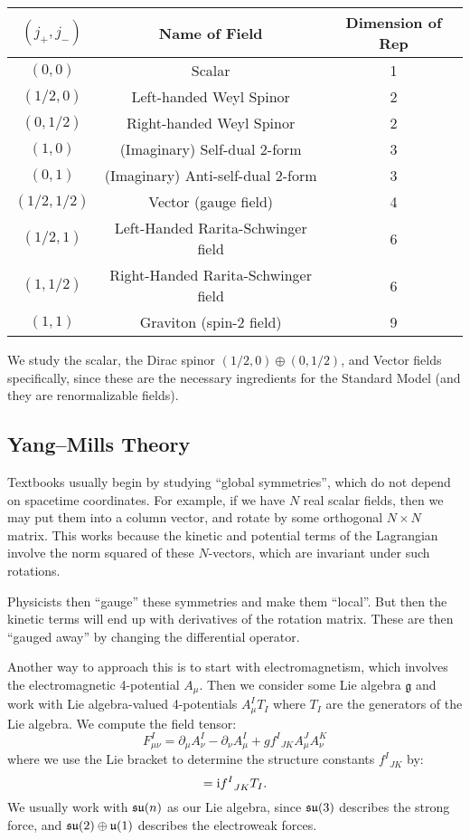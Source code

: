 \begin{center}
\begin{tabular}{c|c|c}
  $(j_{+}, j_{-})$ & Name of Field & Dimension of Rep \\\hline
  $(0, 0)$ &	Scalar  &	1\\
$(1/2, 0)$ & 	Left-handed Weyl Spinor &	2\\
$(0, 1/2)$ &	Right-handed Weyl Spinor &	2\\
$(1, 0)$ &	(Imaginary) Self-dual 2-form &	3\\
$(0, 1)$ &	(Imaginary) Anti-self-dual 2-form &	3\\
$(1/2, 1/2)$ &	Vector (gauge field) &	4\\
$(1/2, 1)$ & 	Left-Handed Rarita-Schwinger field &	6\\
$(1, 1/2)$ &	Right-Handed Rarita-Schwinger field &	6\\
$(1, 1)$ &	Graviton (spin-2 field) &	9
\end{tabular}
\end{center}

\M
We study the scalar, the Dirac spinor $(1/2, 0)\oplus(0, 1/2)$, and
Vector fields specifically, since these are the necessary ingredients
for the Standard Model (and they are renormalizable fields).

\subsection{Yang--Mills Theory}

Textbooks usually begin by studying ``global symmetries'', which do not
depend on spacetime coordinates. For example, if we have $N$ real scalar
fields, then we may put them into a column vector, and rotate by some
orthogonal $N\times N$ matrix. This works because the kinetic and
potential terms of the Lagrangian involve the norm squared of these
$N$-vectors, which are invariant under such rotations.

Physicists then ``gauge'' these symmetries and make them ``local''. But
then the kinetic terms will end up with derivatives of the rotation
matrix. These are then ``gauged away'' by changing the differential
operator.

Another way to approach this is to start with electromagnetism, which
involves the electromagnetic 4-potential $A_{\mu}$. Then we consider
some Lie algebra $\mathfrak{g}$ and work with Lie algebra-valued
4-potentials $A_{\mu}^{I}T_{I}$ where $T_{I}$ are the generators of the
Lie algebra. We compute the field tensor:
\begin{equation}
F_{\mu\nu}^{I} = \partial_{\mu}A^{I}_{\nu} - \partial_{\nu}A^{I}_{\mu}
+g{f^{I}}_{JK}A^{J}_{\mu}A^{K}_{\nu}
\end{equation}
where we use the Lie bracket to determine the structure constants
${f^{I}}_{JK}$ by:
\begin{equation}
[T_{J}, T_{K}] = \I {f^{I}}_{JK}T_{I}.
\end{equation}
We usually work with $\mathfrak{su}(n)$ as our Lie algebra, since $\mathfrak{su}(3)$
describes the strong force, and $\mathfrak{su}(2)\oplus\mathfrak{u}(1)$ describes
the electroweak forces.

